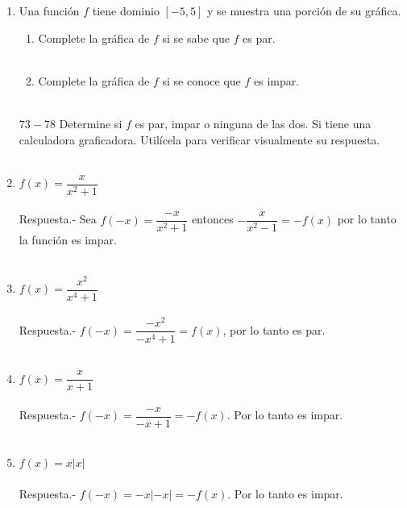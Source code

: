 \begin{enumerate}
    \item Una función $f$ tiene dominio $[-5,5]$ y se muestra una porción de su gráfica. 
    \begin{enumerate}[\bfseries (a)]
	
	\item Complete la gráfica de $f$ si se sabe que $f$ es par.\\\\

	\item Complete la gráfica de $f$ si se conoce que $f$ es impar.\\\\

    \end{enumerate}

    $73-78$ Determine si $f$ es par, impar o ninguna de las dos. Si tiene una calculadora graficadora. Utilícela para verificar visualmente su respuesta.\\\\

    \item $f(x)=\dfrac{x}{x^2 + 1}$\\\\
	Respuesta.-\; Sea $f(-x) = \dfrac{-x}{x^2+1}$ entonces $-\dfrac{x}{x^2-1}=-f(x)$ por lo tanto la función es impar.\\\\ 

    \item $f(x)=\dfrac{x^2}{x^4+1}$\\\\
	Respuesta.-\; $f(-x)=\dfrac{-x^2}{-x^4+1}=f(x)$, por lo tanto es par.\\\\

    \item $f(x)=\dfrac{x}{x+1}$\\\\
	Respuesta.-\; $f(-x)=\dfrac{-x}{-x+1}=-f(x)$. Por lo tanto es impar.\\\\

    \item $f(x)=x|x|$\\\\
	Respuesta.-\; $f(-x)=-x|-x|=-f(x)$. Por lo tanto es impar.\\\\


\end{enumerate}
